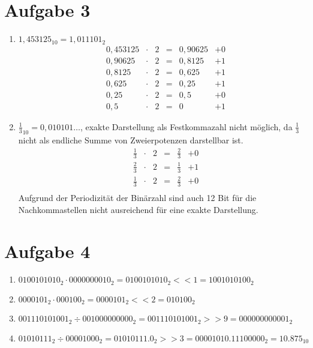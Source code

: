 \documentclass[a4paper]{article}
\begin{document}
\section*{Aufgabe 3}
\begin{enumerate}[label=\alph*)]
\item $1,453125_{10} = 1,011101_2$ \\
	  \begin{align*}
	  	&0,453125 &\cdot& 2 &= &0,90625 &+ 0 \\
		&0,90625  &\cdot& 2 &= &0,8125 &+ 1 \\
		&0,8125   &\cdot& 2 &= &0,625 &+ 1 \\
		&0,625    &\cdot& 2 &= &0,25 &+ 1 \\
		&0,25     &\cdot& 2 &= &0,5 &+ 0 \\
		&0,5      &\cdot& 2 &= &0 &+ 1
      \end{align*}
		
\item $\frac{1}{3}_{10} = 0,010101\ldots$, exakte Darstellung als Festkommazahl nicht möglich,
    da $\frac{1}{3}$ nicht als endliche Summe von Zweierpotenzen darstellbar ist. 
 \begin{align*}
    &\frac{1}{3} &\cdot& 2 &= &\frac{2}{3} &+ 0 \\
    &\frac{2}{3} &\cdot& 2 &= &\frac{1}{3} &+ 1 \\
    &\frac{1}{3} &\cdot& 2 &= &\frac{2}{3} &+ 0 \\
    \end{align*}
    Aufgrund der Periodizität der Binärzahl sind auch 12 Bit für die Nachkommastellen nicht ausreichend für eine exakte Darstellung.
\end{enumerate}

\section*{Aufgabe 4}
\begin{enumerate}[label=\alph*)]
    \item $0100101010_2 \cdot 0000000010_2 = 0100101010_2 << 1 = 1001010100_2$
    \item $0000101_2 \cdot 000100_2 = 0000101_2 << 2 = 010100_2$
    \item $001110101001_2 \div 001000000000_2 = 001110101001_2 >> 9 =000000000001_2 $
    \item $01010111_2 \div 00001000_2 = 01010111.0_2 >> 3 = 00001010.11100000_2 = 10.875_{10}$
\end{enumerate}
\end{document}
